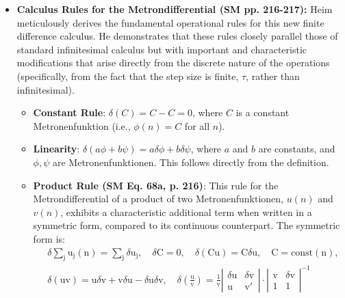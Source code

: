 \documentclass[12pt]{article}
\newcommand{\metron}{\tau}
\newcommand{\metrondifferential}{\delta}
\newcommand{\metronenziffer}{n}
\begin{document}
\begin{itemize}
    \item \textbf{Calculus Rules for the Metrondifferential (SM pp. 216-217):}
    Heim meticulously derives the fundamental operational rules for this new finite difference calculus. He demonstrates that these rules closely parallel those of standard infinitesimal calculus but with important and characteristic modifications that arise directly from the discrete nature of the operations (specifically, from the fact that the step size is finite, \( \metron \), rather than infinitesimal).
    \begin{itemize}
        \item \textbf{Constant Rule}: \( \metrondifferential(C) = C - C = 0 \), where \( C \) is a constant Metronenfunktion (i.e., \( \phi(\metronenziffer) = C \) for all \( \metronenziffer \)).
        \item \textbf{Linearity}: \( \metrondifferential(a\phi + b\psi) = a\metrondifferential\phi + b\metrondifferential\psi \), where \( a \) and \( b \) are constants, and \( \phi, \psi \) are Metronenfunktionen. This follows directly from the definition.
        \item \textbf{Product Rule (SM Eq. 68a, p. 216)}: This rule for the Metrondifferential of a product of two Metronenfunktionen, \( u(\metronenziffer) \) and \( v(\metronenziffer) \), exhibits a characteristic additional term when written in a symmetric form, compared to its continuous counterpart. The symmetric form is:
        \begin{equation}
        \begin{aligned}
        & \delta\sum_\mathrm{j} \mathrm{u_j}(\mathrm{n}) = \sum_\mathrm{j} \delta\mathrm{u_j}, \quad \delta\mathrm{C} = 0, \quad \delta(\mathrm{Cu}) = \mathrm{C}\delta\mathrm{u}, \quad \mathrm{C} = \text{const}(\mathrm{n}), \\
        & \delta(\mathrm{uv}) = \mathrm{u}\delta\mathrm{v} + \mathrm{v}\delta\mathrm{u} - \delta\mathrm{u}\delta\mathrm{v}, \quad \delta\left( \frac{\mathrm{u}}{\mathrm{v}} \right) = \frac{1}{\mathrm{v}} \left| \begin{matrix} \delta\mathrm{u} & \delta\mathrm{v} \\ \mathrm{u} & \mathrm{v}' \end{matrix} \right| \cdot \left| \begin{matrix} \mathrm{v} & \delta\mathrm{v} \\ 1 & 1 \end{matrix} \right|^{-1}
        \end{aligned} \tag{68a}

\end{equation}
\end{itemize}
\end{itemize}
\end{document}
